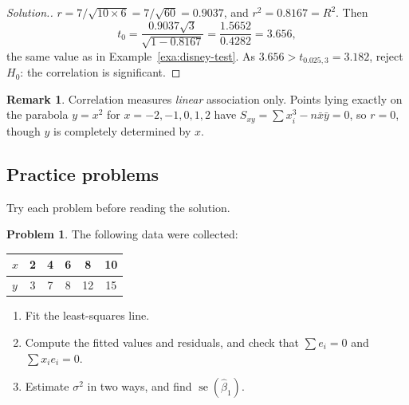 \documentclass[11pt,a4paper]{article}
\numberwithin{equation}{section}
\theoremstyle{definition}
\newtheorem*{remark}{Remark}
\newtheorem{problemx}{Problem}[subsection]
\newenvironment{problem}{\begin{problemx}}{\end{problemx}}
\newenvironment{solution}
  {\renewcommand{\qedsymbol}{}\begin{proof}[\textit{Solution}.]}
  {\end{proof}}
\begin{document}
\begin{solution}
$r = 7/\sqrt{10 \times 6} = 7/\sqrt{60} = 0.9037$, and $r^2 = 0.8167 = R^2$. Then
\[
t_0 = \frac{0.9037\sqrt{3}}{\sqrt{1 - 0.8167}} = \frac{1.5652}{0.4282} = 3.656 ,
\]
the same value as in Example~\ref{exa:disney-test}. As $3.656 > t_{0.025,3} = 3.182$, reject
$H_0$: the correlation is significant.
\end{solution}

\begin{remark}
Correlation measures \emph{linear} association only. Points lying exactly on the parabola
$y = x^2$ for $x = -2, -1, 0, 1, 2$ have $S_{xy} = \sum x_i^3 - n\bar x \bar y = 0$, so $r = 0$,
though $y$ is completely determined by $x$.
\end{remark}

\subsection{Practice problems}
Try each problem before reading the solution.

\begin{problem}\label{prob:fit}
The following data were collected:
\begin{center}
\begin{tabular}{l|ccccc}
$x$ & 2 & 4 & 6 & 8 & 10 \\
\hline
$y$ & 3 & 7 & 8 & 12 & 15 \\
\end{tabular}
\end{center}
\begin{enumerate}[label=(\alph*)]
\item Fit the least-squares line.
\item Compute the fitted values and residuals, and check that $\sum e_i = 0$ and $\sum x_i e_i = 0$.
\item Estimate $\sigma^2$ in two ways, and find $\operatorname{se}(\hat\beta_1)$.
\end{enumerate}
\end{problem}
\end{document}

